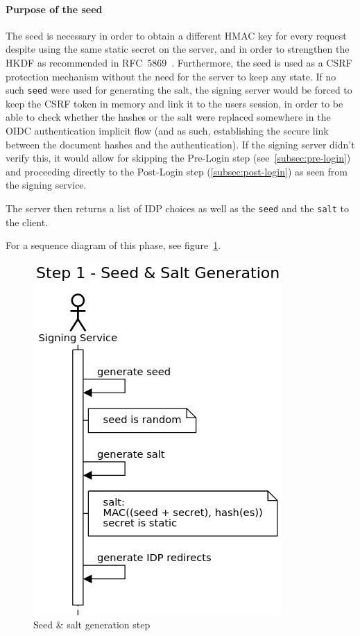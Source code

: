 \paragraph{Purpose of the seed}
The seed is necessary in order to obtain a different \gls{HMAC} key for every request
despite using the same static secret on the server,
and in order to strengthen the \gls{HKDF} as recommended in RFC~5869~\cite[Section 3.1]{rfc5869}.
Furthermore, the seed is used as a \gls{CSRF} protection mechanism without the need for the server to keep any state.
If no such \texttt{seed} were used for generating the salt,
the signing server would be forced to keep the \gls{CSRF} token in memory and link it to the users session,
in order to be able to check whether the hashes or the salt were replaced somewhere in the \gls{OIDC} authentication implicit flow
(and as such, establishing the secure link between the document hashes and the authentication).
If the signing server didn't verify this,
it would allow for skipping the Pre-Login step (see~\ref{subsec:pre-login})
and proceeding directly to the Post-Login step (\ref{subsec:post-login}) as seen from the signing service.

The server then returns a list of \gls{IDP} choices as well as the \texttt{seed} and the \texttt{salt} to the client.

For a sequence diagram of this phase, see figure~\ref{fig:seedgenerationstep}.

\begin{figure}
    \begin{center}
        \includegraphics[scale=0.5]{images/protocol_step1_seed_generation.png}
        \caption{Seed & salt generation step}
        \label{fig:seedgenerationstep}
    \end{center}
\end{figure}

